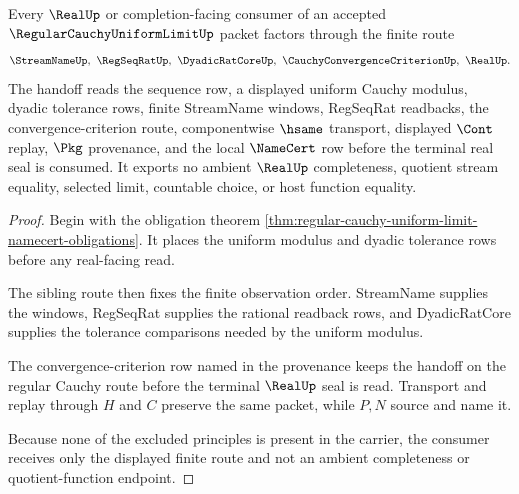 \begin{theorem}
\label{thm:regular-cauchy-uniform-limit-real-handoff}
Every $\RealUp$ or completion-facing consumer of an accepted $\RegularCauchyUniformLimitUp$ packet factors through the finite route
$$
\StreamNameUp,\ \RegSeqRatUp,\ \DyadicRatCoreUp,\ \CauchyConvergenceCriterionUp,\ \RealUp .
$$
The handoff reads the sequence row, a displayed uniform Cauchy modulus, dyadic tolerance rows, finite StreamName windows, RegSeqRat readbacks, the convergence-criterion route, componentwise $\hsame$ transport, displayed $\Cont$ replay, $\Pkg$ provenance, and the local $\NameCert$ row before the terminal real seal is consumed. It exports no ambient $\RealUp$ completeness, quotient stream equality, selected limit, countable choice, or host function equality.
\end{theorem}
\begin{proof}
Begin with the obligation theorem \autoref{thm:regular-cauchy-uniform-limit-namecert-obligations}. It places the uniform modulus and dyadic tolerance rows before any real-facing read.

The sibling route then fixes the finite observation order. StreamName supplies the windows, RegSeqRat supplies the rational readback rows, and DyadicRatCore supplies the tolerance comparisons needed by the uniform modulus.

The convergence-criterion row named in the provenance keeps the handoff on the regular Cauchy route before the terminal $\RealUp$ seal is read. Transport and replay through $H$ and $C$ preserve the same packet, while $P,N$ source and name it.

Because none of the excluded principles is present in the carrier, the consumer receives only the displayed finite route and not an ambient completeness or quotient-function endpoint.
\end{proof}




